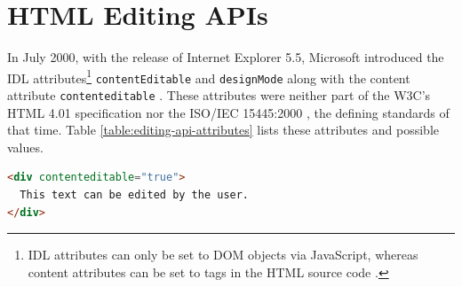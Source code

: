 \section{HTML Editing APIs}
\label{sec:html-editing-apis}

In July 2000, with the release of Internet Explorer 5.5, Microsoft introduced the IDL attributes\footnote{IDL attributes can only be set to DOM objects via JavaScript, whereas content attributes can be set to tags in the HTML source code \cite{WebIDL}.} \texttt{contentEditable} and \texttt{designMode} along with the content attribute \texttt{contenteditable} \cite{ac,ac2}. These attributes were neither part of the W3C's HTML 4.01 specification \cite{HTML401} nor the ISO/IEC 15445:2000 \cite{ISO15445}, the defining standards of that time. Table \ref{table:editing-api-attributes} lists these attributes and possible values.


\begin{table}[]
\centering
{}
\caption{Editing API attributes}
\label{table:editing-api-attributes}
\end{table}

\begin{lstlisting}[language=html, caption=An element set to editing mode, label=lst:div-contenteditable]
<div contenteditable="true">
  This text can be edited by the user.
</div>
\end{lstlisting}

